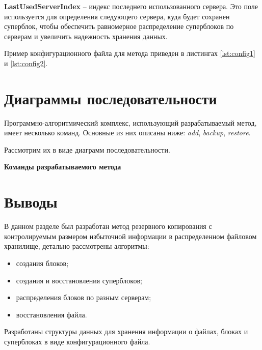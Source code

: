 \textbf{LastUsedServerIndex} -- индекс последнего использованного сервера. Это поле используется для определения следующего сервера, куда будет сохранен суперблок, чтобы обеспечить равномерное распределение суперблоков по серверам и увеличить надежность хранения данных.


Пример конфигурационного файла для метода приведен в листингах \ref{lst:config1} и \ref{lst:config2}.  



\newpage
\section{Диаграммы последовательности}

Программно-алгоритмический комплекс, использующий разрабатываемый метод, имеет несколько команд. Основные из них описаны ниже: \textit{add}, \textit{backup}, \textit{restore}.

Рассмотрим их в виде диаграмм последовательности.  

\textbf{Команды разрабатываемого метода}


\newpage



\newpage

\section{Выводы}
\begin{flushleft}
В данном разделе был разработан метод резервного копирования с контролируемым размером избыточной информации в распределенном файловом хранилище, детально рассмотрены алгоритмы:
\end{flushleft}
\begin{itemize}
\item создания блоков;
\item создания и восстановления суперблоков;
\item распределения блоков по разным серверам;
\item восстановления файла.
\end{itemize}

Разработаны структуры данных для хранения информации о файлах, блоках и суперблоках в виде конфигурационного файла.  
